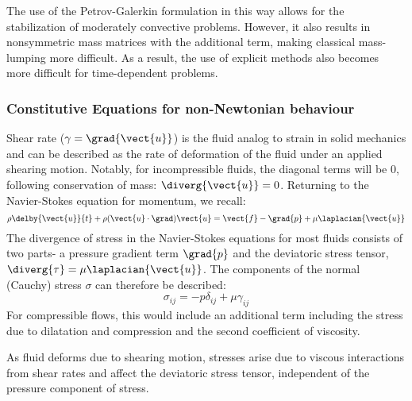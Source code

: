 The use of the Petrov-Galerkin formulation in this way allows for the stabilization of moderately convective problems. However, it also results in nonsymmetric mass matrices with the additional term, making classical mass-lumping more difficult. As a result, the use of explicit methods also becomes more difficult for time-dependent problems. 

\subsubsection{Constitutive Equations for non-Newtonian behaviour}
Shear rate ($\gamma=\grad{\vect{u}}$) is the fluid analog to strain in solid mechanics and can be described as the rate of deformation of the fluid under an applied shearing motion. Notably, for incompressible fluids, the diagonal terms will be 0, following conservation of mass: $\diverg{\vect{u}} = 0$. 
Returning to the Navier-Stokes equation for momentum, we recall:
\begin{equation}
  \label{eqn:NSE}
    \rho\delby{\vect{u}}{t}+\rho(\vect{u}\cdot\grad)\vect{u}=\vect{f}-\grad{p}+\mu\laplacian{\vect{u}}
\end{equation}
The divergence of stress in the Navier-Stokes equations for most fluids consists of two parts- a pressure gradient term $\grad{p}$ and the deviatoric stress tensor, $\diverg{\tau} = \mu\laplacian{\vect{u}}$. The components of the normal (Cauchy) stress $\sigma$ can therefore be described:
\begin{equation}
  \label{eqn:NSE}
    \sigma_{ij} = -p\delta_{ij} + \mu\gamma_{ij}
\end{equation}
For compressible flows, this would include an additional term including the stress due to dilatation and compression and the second coefficient of viscosity.

As fluid deforms due to shearing motion, stresses arise due to viscous interactions from shear rates and affect the deviatoric stress tensor, independent of the pressure component of stress.

